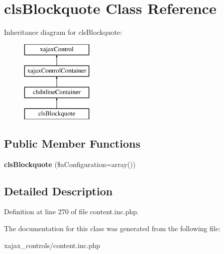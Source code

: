 \hypertarget{classclsBlockquote}{
\section{clsBlockquote Class Reference}
\label{classclsBlockquote}
}
Inheritance diagram for clsBlockquote:\begin{figure}[H]
\begin{center}
\leavevmode
\includegraphics[height=4.000000cm]{classclsBlockquote}
\end{center}
\end{figure}
\subsection*{Public Member Functions}
\begin{DoxyCompactItemize}
\item 
\hypertarget{classclsBlockquote_abe0a6bbdad25454ca974ef9665a3d4be}{
{\bfseries clsBlockquote} (\$aConfiguration=array())}
\label{classclsBlockquote_abe0a6bbdad25454ca974ef9665a3d4be}

\end{DoxyCompactItemize}


\subsection{Detailed Description}


Definition at line 270 of file content.inc.php.



The documentation for this class was generated from the following file:\begin{DoxyCompactItemize}
\item 
xajax\_\-controls/content.inc.php\end{DoxyCompactItemize}
